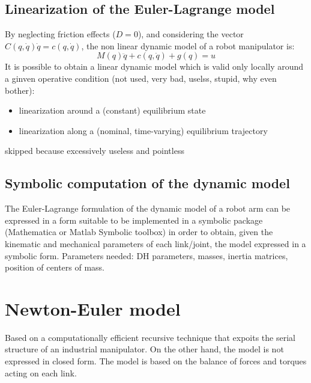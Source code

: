 \documentclass{book}
\begin{document}
\subsection{Linearization of the Euler-Lagrange model}
By neglecting friction effects ($D=0$), and considering the vector $C(q,\dot{q})\dot{q} = c(q,\dot{q})$, the non linear dynamic model of a robot manipulator is:
\[
    M(q)\ddot{q}+c(q,\dot{q})+g(q)=u
\]
It is possible to obtain a linear dynamic model which is valid only locally around a ginven operative condition (not used, very bad, uselss, stupid, why even bother):
\begin{itemize}
    \item linearization around a (constant) equilibrium state 
    \item linearization along a (nominal, time-varying) equilibrium trajectory
\end{itemize}
skipped because excessively useless and pointless


\subsection{Symbolic computation of the dynamic model}
The Euler-Lagrange formulation of the dynamic model of a robot arm can be expressed in a form suitable to be implemented in a symbolic package (Mathematica or Matlab Symbolic toolbox) in order to obtain, given the kinematic and mechanical parameters of each link/joint, the model expressed in a symbolic form. Parameters needed: DH parameters, masses, inertia matrices, position of centers of mass.





























\section{Newton-Euler model}
Based on a computationally efficient recursive technique that expoits the serial structure of an industrial manipulator. On the other hand, the model is not expressed in closed form.
The model is based on the balance of forces and torques acting on each link. 
\end{document}
